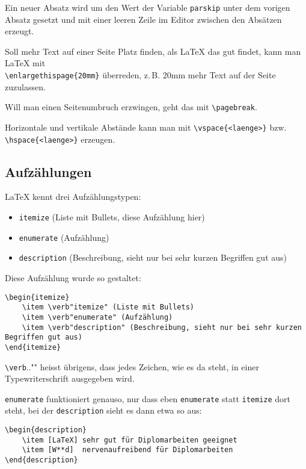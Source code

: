 		Ein neuer Absatz wird um den Wert der Variable \verb"parskip" unter dem vorigen Absatz gesetzt und mit einer leeren Zeile im Editor zwischen den Absätzen erzeugt.
		
		Soll mehr Text auf einer Seite Platz finden, als \LaTeX{} das gut findet, kann man \LaTeX{} mit \\
		\verb"\enlargethispage{20mm}" überreden, z.\,B. 20mm mehr Text auf der Seite zuzulassen.
		
		Will man einen Seitenumbruch erzwingen, geht das mit \verb"\pagebreak".
		
		Horizontale und vertikale Abstände kann man mit \verb"\vspace{<laenge>}" bzw. \verb"\hspace{<laenge>}" erzeugen.

		
	\subsection{Aufzählungen}
		\LaTeX{} kennt drei Aufzählungstypen:
		\begin{itemize}
			\item \verb"itemize" (Liste mit Bullets, diese Aufzählung hier)
			\item \verb"enumerate" (Aufzählung)
			\item \verb"description" (Beschreibung, sieht nur bei sehr kurzen Begriffen gut aus)
		\end{itemize}
		
		\pagebreak
		Diese Aufzählung wurde so gestaltet:
		\begin{verbatim}
\begin{itemize}
    \item \verb"itemize" (Liste mit Bullets)
    \item \verb"enumerate" (Aufzählung)
    \item \verb"description" (Beschreibung, sieht nur bei sehr kurzen Begriffen gut aus)
\end{itemize} 		
		\end{verbatim}
		
		\verb"\verb".."" heisst übrigens, dass jedes Zeichen, wie es da steht, in einer Typewriterschrift ausgegeben wird.
		
	 \verb"enumerate" funktioniert genauso, nur dass eben \verb"enumerate" statt \verb"itemize" dort steht, bei der \verb"description" sieht es dann etwa so aus:
		\begin{verbatim}
\begin{description}
    \item [LaTeX] sehr gut für Diplomarbeiten geeignet
    \item [W**d]  nervenaufreibend für Diplomarbeiten
\end{description} 		
		\end{verbatim}	  
		

